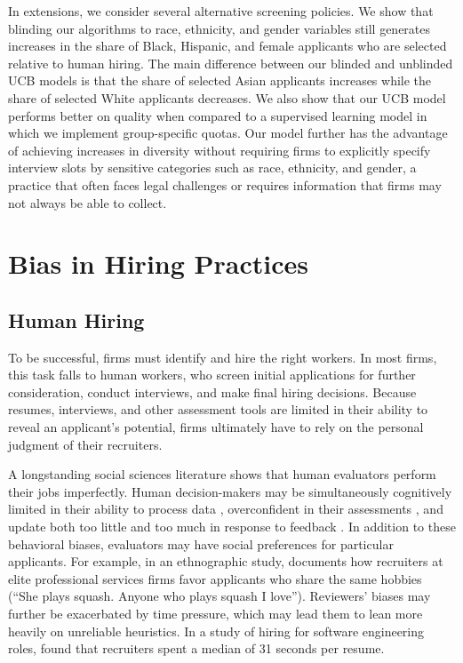 \documentclass[crop,noquery,editorname,historyrev,nosurname,runningno,sepcount]{RESTUD}
\begin{document}
In extensions, we consider several alternative screening policies.  We show that blinding our algorithms to race, ethnicity, and gender variables still generates increases in the share of Black, Hispanic, and female applicants who are selected relative to human hiring.  The main difference between our blinded and unblinded UCB models is that the share of selected Asian applicants increases while the share of selected White applicants decreases.  We also show that our UCB model performs better on quality when compared to a supervised learning model in which we implement group-specific quotas.  Our model further has the advantage of achieving increases in diversity without requiring firms to explicitly specify interview slots by sensitive categories such as race, ethnicity, and gender, a practice that often faces legal challenges or requires information that firms may not always be able to collect.   


\section{Bias in Hiring Practices} \label{setting}

\subsection{Human Hiring}\label{sec:humans}

To be successful, firms must identify and hire the right workers. In most firms, this task falls to human workers, who screen initial applications for further consideration, conduct interviews, and make final hiring decisions.  Because resumes, interviews, and other assessment tools are limited in their ability to reveal an applicant's potential, firms ultimately have to rely on the personal judgment of their recruiters.

A longstanding social sciences literature shows that human evaluators perform their jobs imperfectly.  Human decision-makers may be simultaneously cognitively limited in their ability to process data \citep{TREISMAN198097, GABAIX2019261, benjamin}, overconfident in their assessments \citep{svenson, fischhof, kausel}, and update both too little and too much in response to feedback \citep{mobius}.  In addition to these behavioral biases, evaluators may have social preferences for particular applicants.  For example, in an ethnographic study, \citet{Rivera2012} documents how recruiters at elite professional services firms favor applicants who share the same hobbies (``She plays squash. Anyone who plays squash I love'').  Reviewers' biases may further be exacerbated by time pressure, which may lead them to lean more heavily on unreliable heuristics.  In a study of hiring for software engineering roles, \citet{alinerrecruiters2024} found that recruiters spent a median of 31 seconds per resume.  
\end{document}
